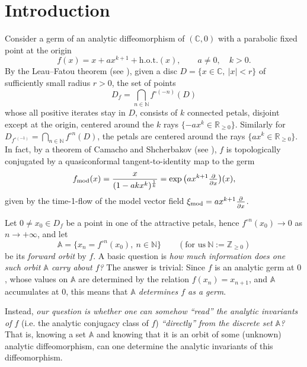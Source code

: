 \documentclass[a4paper,11pt]{amsart}
\numberwithin{equation}{section}
\newcommand{\C}{{\mathbb C}}
\newcommand{\N}{{\mathbb N}}
\newcommand{\Z}{{\mathbb Z}}
\newcommand{\R}{{\mathbb R}}
\newcommand{\hot}{\mathrm{h.o.t.}}
\newcommand{\tdd}[1]{\tfrac{\partial}{\partial #1 \vphantom{\hat X}}}
\newcommand{\model}{{\mathrm{mod}}}
\newcommand{\fmod}{f_\model}
\newcommand{\ximod}{\xi_\model}
\newcommand{\orbit}{\mathbb{A}}
\theoremstyle{definition}
\begin{document}
\section{Introduction}
Consider a germ of an analytic diffeomorphism of $(\C,0)$ with a parabolic fixed point at the origin
\begin{equation}\label{eq:f}
	f(x)=x+ax^{k+1}+\hot(x), \qquad a\neq 0,\quad k>0.
\end{equation}
By the Leau--Fatou theorem (see \cite{Bracci,IlYa,Loray}), given a disc $D=\{x\in\C,\ |x|<r\}$ of sufficiently small radius $r>0$,  
the set of points \begin{equation}\label{eq:Df}
D_f=\bigcap_{n\in\N}f^{\circ(-n)}(D)
\end{equation}
whose all positive iterates stay in $D$, consists of $k$ connected petals, disjoint except at the origin, centered around the $k$ rays $\{-ax^k\in\R_{\geq 0}\}$. Similarly for $D_{f^{\circ(-1)}}=\bigcap_{n\in\N}f^{\circ n}(D)$, the petals are centered around the rays $\{ax^k\in\R_{\geq 0}\}$. 
In fact, by a theorem of Camacho and Shcherbakov (see \cite{Bracci,IlYa,Loray}), $f$ is topologically conjugated by a quasiconformal tangent-to-identity map to the germ
\begin{equation}\label{eq:fmod}
	\fmod(x)=\frac{x}{(1-akx^k)^{\frac1k}}=\exp\big(ax^{k+1}\tdd{x}\big)(x),
\end{equation}
given by the time-1-flow of the model vector field $\ximod=ax^{k+1}\tdd{x}$.

Let $0\neq x_0\in D_f$ be a point in one of the attractive petals, hence $f^{\circ n}(x_0)\to 0$ as $n\to+\infty$, and let
\begin{equation}\label{eq:orbit}
	\orbit=\{x_n=f^{\circ n}(x_0),\ n\in\N\}\qquad(\text{for us}\ \N:=\Z_{\geq 0})
\end{equation} 
be its \emph{forward orbit} by $f$.
A basic question is \emph{how much information does one such orbit $\orbit$ carry about $f$?}
The answer is trivial: 
Since $f$ is an analytic germ at $0$, whose values on $\orbit$ are determined by the relation $f(x_n)=x_{n+1}$,
and $\orbit$ accumulates at $0$, this means that \emph{$\orbit$ determines $f$ as a germ}. 

Instead, \emph{our question is whether one can somehow ``read'' the analytic invariants of $f$} (i.e. the analytic conjugacy class of $f$) \emph{``directly'' from the discrete set $\orbit$?} 
That is, knowing a set $\orbit$ and knowing that it is an orbit of some (unknown) analytic diffeomorphism, can one determine the analytic invariants of this diffeomorphism.
\end{document}
